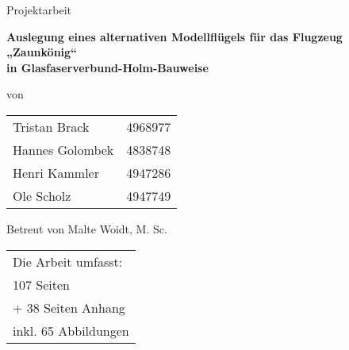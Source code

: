 
\begin{center}

	\par\bigskip
	\par\bigskip
	\par\bigskip
	\par\bigskip	
	\par\bigskip
	\par\bigskip	
	{Projektarbeit}\\
\begin{huge}	\par\bigskip
	\par\bigskip	
	\par\bigskip
	\par\bigskip	
	\textbf{Auslegung eines alternativen Modellflügels für das Flugzeug „Zaunkönig“} \\
	\textbf{in Glasfaserverbund-Holm-Bauweise}\\
	\par\bigskip
	\par\bigskip
	
	\end{huge}

	\par\bigskip
	
\par\bigskip
\par\bigskip	
	\par\bigskip
\par\bigskip
von	
\par\bigskip
\par\bigskip
\begin{tabular}{lr}
	Tristan Brack& 4968977\\
	Hannes Golombek & 4838748\\
	Henri Kammler & 4947286\\
	Ole Scholz & 4947749 \\
\end{tabular}
\par\bigskip
\par\bigskip	
\par\bigskip

Betreut von Malte Woidt, M. Sc.\\
\par\bigskip
\par\bigskip
\par\bigskip	
\par\bigskip
\par\bigskip	
\par\bigskip
\end{center}
\begin{tabular}{l}
	Die Arbeit umfasst:\\
	107 Seiten\\
	\:\:\:+ 38 Seiten Anhang\\
	inkl. 65 Abbildungen\\
\end{tabular}

